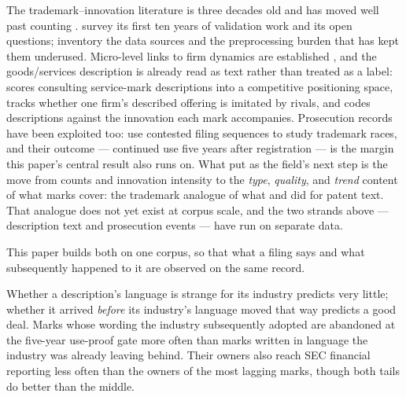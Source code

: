 \documentclass[11pt]{article}
\begin{document}
The trademark--innovation literature is three decades old and has moved
well past counting \citep{Castaldi2020}. \citet{Flikkema2025} survey its first ten years of
validation work and its open questions; \citet{Willeke2026} inventory the
data sources and the preprocessing burden that has kept them underused.
Micro-level links to firm dynamics are established \citep{Dinlersoz2018,
Dinlersoz2023}, and the goods/services description is already read as
text rather than treated as a label: \citet{Semadeni2006} scores
consulting service-mark descriptions into a competitive positioning
space, \citet{SemadeniAnderson2010} tracks whether one firm's described
offering is imitated by rivals, and \citet{Flikkema2019} codes
descriptions against the innovation each mark accompanies. Prosecution
records have been exploited too: \citet{Fink2024} use contested filing
sequences to study trademark races, and their outcome --- continued use
five years after registration --- is the margin this paper's central
result also runs on. What \citet{Flikkema2025} put as the field's next
step is the move from counts and innovation intensity to the \emph{type},
\emph{quality}, and \emph{trend} content of what marks cover: the
trademark analogue of what \citet{Kelly2021} and \citet{Kalyani2024} did
for patent text. That analogue does not yet exist at corpus scale, and
the two strands above --- description text and prosecution events --- have
run on separate data.

This paper builds both on one corpus, so that what a filing says and what
subsequently happened to it are observed on the same record.

Whether a description's language is strange for its industry predicts very
little; whether it arrived \emph{before} its industry's language moved that
way predicts a good deal. Marks whose wording the industry subsequently
adopted are abandoned at the five-year use-proof gate more often than marks
written in language the industry was already leaving behind. Their owners
also reach SEC financial reporting less often than the owners of the most
lagging marks, though both tails do better than the middle.
\end{document}
